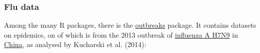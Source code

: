 \documentclass[]{article}
\newenvironment{Shaded}{\begin{snugshade}}{\end{snugshade}}
\newcommand{\KeywordTok}[1]{\textcolor[rgb]{0.13,0.29,0.53}{\textbf{{#1}}}}
\newcommand{\DataTypeTok}[1]{\textcolor[rgb]{0.13,0.29,0.53}{{#1}}}
\newcommand{\StringTok}[1]{\textcolor[rgb]{0.31,0.60,0.02}{{#1}}}
\newcommand{\CommentTok}[1]{\textcolor[rgb]{0.56,0.35,0.01}{\textit{{#1}}}}
\newcommand{\OtherTok}[1]{\textcolor[rgb]{0.56,0.35,0.01}{{#1}}}
\newcommand{\NormalTok}[1]{{#1}}
\begin{document}
\subsubsection{Flu data}\label{flu-data}

Among the many R packages, there is the
\href{https://mran.microsoft.com/web/packages/outbreaks/outbreaks.pdf}{outbreaks}
package. It contains datasets on epidemics, on of which is from the 2013
outbreak of
\href{http://www.who.int/influenza/human_animal_interface/faq_H7N9/en/}{influenza
A H7N9} in
\href{http://www.who.int/influenza/human_animal_interface/influenza_h7n9/ChinaH7N9JointMissionReport2013u.pdf?ua=1}{China},
as analysed by Kucharski et al. (2014):

\begin{Shaded}
\end{Shaded}
\end{document}
